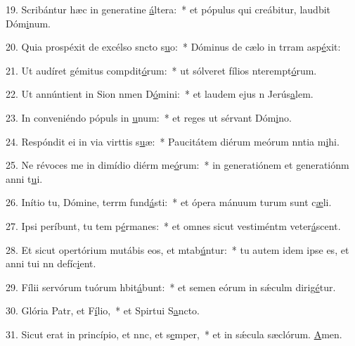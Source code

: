 19. Scribántur hæc in generatine \uline{á}ltera:~* et pópulus qui creábitur, laudbit Dóm\uline{i}num.\par 
20. Quia prospéxit de excélso sncto s\uline{u}o:~* Dóminus de cælo in trram asp\uline{é}xit:\par 
21. Ut audíret gémitus compdit\uline{ó}rum:~* ut sólveret fílios nterempt\uline{ó}rum.\par 
22. Ut annúntient in Sion nmen D\uline{ó}mini:~* et laudem ejus n Jerús\uline{a}lem.\par 
23. In conveniéndo pópuls in \uline{u}num:~* et reges ut sérvant Dóm\uline{i}no.\par 
24. Respóndit ei in via virttis s\uline{u}æ:~* Paucitátem diérum meórum nntia m\uline{i}hi.\par 
25. Ne révoces me in dimídio diérm me\uline{ó}rum:~* in generatiónem et generatiónm anni t\uline{u}i.\par 
26. Inítio tu, Dómine, terrm fund\uline{á}sti:~* et ópera mánuum turum sunt c\uline{æ}li.\par 
27. Ipsi períbunt, tu tem p\uline{é}rmanes:~* et omnes sicut vestiméntm veter\uline{á}scent.\par 
28. Et sicut opertórium mutábis eos, et mtab\uline{ú}ntur:~* tu autem idem ipse es, et anni tui nn defíc\uline{i}ent.\par 
29. Fílii servórum tuórum hbit\uline{á}bunt:~* et semen eórum in sǽculm dirig\uline{é}tur.\par 
30. Glória Patr, et F\uline{í}lio,~* et Spirtui S\uline{a}ncto.\par 
31. Sicut erat in princípio, et nnc, et s\uline{e}mper,~* et in sǽcula sæclórum. \uline{A}men.\par 
